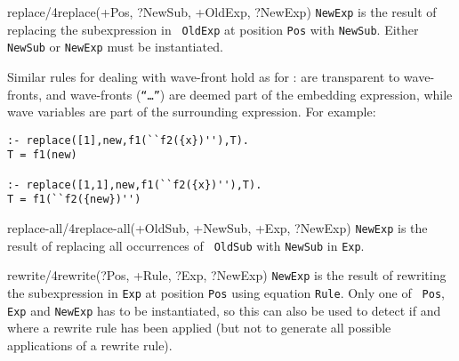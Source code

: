 \begin{predicate}{replace/4}{replace(+Pos, ?NewSub, +OldExp, ?NewExp)}%
{\tt NewExp} is the result of replacing the subexpression in {\tt
OldExp} at position {\tt Pos} with {\tt NewSub}. Either {\tt NewSub}
or {\tt NewExp} must be instantiated.

Similar rules for dealing with wave-front hold as for :
 are transparent to wave-fronts, and
wave-fronts ({\tt ``\ldots''}) are deemed part of the embedding
expression, while wave variables are part of the surrounding
expression. For example:
\begin{verbatim}
:- replace([1],new,f1(``f2({x})''),T).
T = f1(new)

:- replace([1,1],new,f1(``f2({x})''),T).
T = f1(``f2({new})'')
\end{verbatim}
\end{predicate}

\begin{predicate}{replace-all/4}{replace-all(+OldSub, +NewSub, +Exp, ?NewExp)}%
{\tt NewExp} is the result of replacing all occurrences of {\tt
OldSub} with {\tt NewSub} in {\tt Exp}.
\end{predicate}

\begin{predicate}{rewrite/4}{rewrite(?Pos, +Rule, ?Exp, ?NewExp)}%
{\tt NewExp} is the result of rewriting the subexpression in {\tt Exp}
at position {\tt Pos} using equation {\tt Rule}.  Only one of {\tt
Pos}, {\tt Exp} and {\tt NewExp} has to be instantiated, so this can
also be used to detect if and where a rewrite rule has been applied
(but not to generate all possible applications of a rewrite rule).
\end{predicate}

